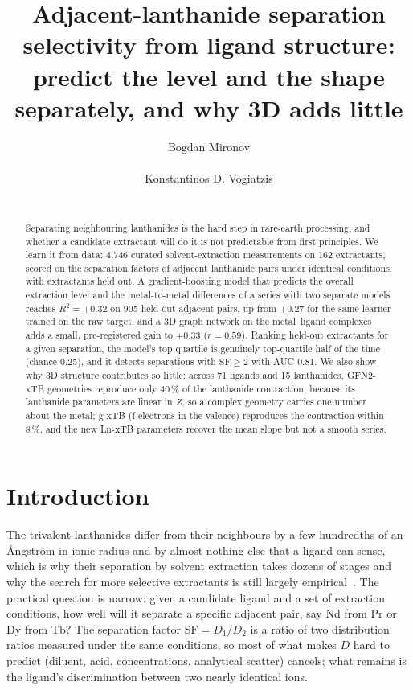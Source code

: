 \documentclass{article}
\title[Adjacent-lanthanide selectivity from ligand structure]{Adjacent-lanthanide separation selectivity from ligand structure:\\ predict the level and the shape separately, and why 3D adds little}
\author[B. Mironov et al.]{%
Bogdan Mironov\\
\institute{TODO affiliation}\\
\email{bogdan\_mironov@icloud.com}\And
Konstantinos D. Vogiatzis\\
\institute{University of Tennessee, Knoxville}\\
\email{TODO}
}
\begin{document}
\maketitle

\begin{abstract}
Separating neighbouring lanthanides is the hard step in rare-earth processing, and whether a candidate extractant will do it is not predictable from first principles.
We learn it from data: 4{,}746 curated solvent-extraction measurements on 162 extractants, scored on the separation factors of adjacent lanthanide pairs under identical conditions, with extractants held out.
A gradient-boosting model that predicts the overall extraction level and the metal-to-metal differences of a series with two separate models reaches $R^2 = +0.32$ on 905 held-out adjacent pairs, up from $+0.27$ for the same learner trained on the raw target, and a 3D graph network on the metal--ligand complexes adds a small, pre-registered gain to $+0.33$ ($r = 0.59$).
Ranking held-out extractants for a given separation, the model's top quartile is genuinely top-quartile half of the time (chance 0.25), and it detects separations with $\mathrm{SF} \geq 2$ with AUC 0.81.
We also show why 3D structure contributes so little: across 71 ligands and 15 lanthanides, GFN2-xTB geometries reproduce only 40\,\% of the lanthanide contraction, because its lanthanide parameters are linear in $Z$, so a complex geometry carries one number about the metal; g-xTB (f electrons in the valence) reproduces the contraction within 8\,\%, and the new Ln-xTB parameters recover the mean slope but not a smooth series.
\end{abstract}

\section{Introduction}

The trivalent lanthanides differ from their neighbours by a few hundredths of an \AA{}ngstr\"om in ionic radius and by almost nothing else that a ligand can sense, which is why their separation by solvent extraction takes dozens of stages and why the search for more selective extractants is still largely empirical~\cite{cheisson2019,nash1993}.
The practical question is narrow: given a candidate ligand and a set of extraction conditions, how well will it separate a specific adjacent pair, say Nd from Pr or Dy from Tb?
The separation factor $\mathrm{SF} = D_1/D_2$ is a ratio of two distribution ratios measured under the same conditions, so most of what makes $D$ hard to predict (diluent, acid, concentrations, analytical scatter) cancels; what remains is the ligand's discrimination between two nearly identical ions.
\end{document}
